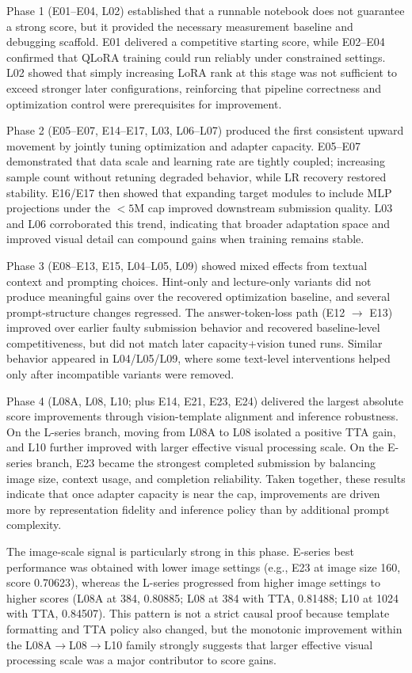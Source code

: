 \documentclass[11pt]{article}
\begin{document}
Phase 1 (E01--E04, L02) established that a runnable notebook does not guarantee a strong score, but it provided the necessary measurement baseline and debugging scaffold. E01 delivered a competitive starting score, while E02--E04 confirmed that QLoRA training could run reliably under constrained settings. L02 showed that simply increasing LoRA rank at this stage was not sufficient to exceed stronger later configurations, reinforcing that pipeline correctness and optimization control were prerequisites for improvement.

Phase 2 (E05--E07, E14--E17, L03, L06--L07) produced the first consistent upward movement by jointly tuning optimization and adapter capacity. E05--E07 demonstrated that data scale and learning rate are tightly coupled; increasing sample count without retuning degraded behavior, while LR recovery restored stability. E16/E17 then showed that expanding target modules to include MLP projections under the $<5$M cap improved downstream submission quality. L03 and L06 corroborated this trend, indicating that broader adaptation space and improved visual detail can compound gains when training remains stable.

Phase 3 (E08--E13, E15, L04--L05, L09) showed mixed effects from textual context and prompting choices. Hint-only and lecture-only variants did not produce meaningful gains over the recovered optimization baseline, and several prompt-structure changes regressed. The answer-token-loss path (E12 $\rightarrow$ E13) improved over earlier faulty submission behavior and recovered baseline-level competitiveness, but did not match later capacity+vision tuned runs. Similar behavior appeared in L04/L05/L09, where some text-level interventions helped only after incompatible variants were removed.

Phase 4 (L08A, L08, L10; plus E14, E21, E23, E24) delivered the largest absolute score improvements through vision-template alignment and inference robustness. On the L-series branch, moving from L08A to L08 isolated a positive TTA gain, and L10 further improved with larger effective visual processing scale. On the E-series branch, E23 became the strongest completed submission by balancing image size, context usage, and completion reliability. Taken together, these results indicate that once adapter capacity is near the cap, improvements are driven more by representation fidelity and inference policy than by additional prompt complexity.

The image-scale signal is particularly strong in this phase. E-series best performance was obtained with lower image settings (e.g., E23 at image size 160, score 0.70623), whereas the L-series progressed from higher image settings to higher scores (L08A at 384, 0.80885; L08 at 384 with TTA, 0.81488; L10 at 1024 with TTA, 0.84507). This pattern is not a strict causal proof because template formatting and TTA policy also changed, but the monotonic improvement within the L08A$\rightarrow$L08$\rightarrow$L10 family strongly suggests that larger effective visual processing scale was a major contributor to score gains.
\end{document}
